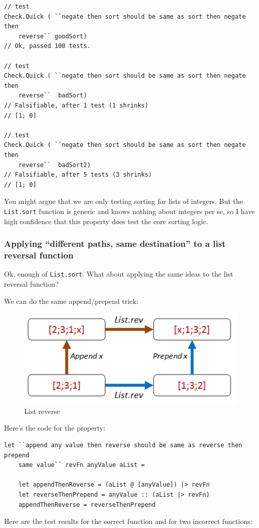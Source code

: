 \begin{verbatim}
// test
Check.Quick ( ``negate then sort should be same as sort then negate then 
    reverse`` goodSort)
// Ok, passed 100 tests.

// test
Check.Quick ( ``negate then sort should be same as sort then negate then 
    reverse``  badSort)
// Falsifiable, after 1 test (1 shrinks) 
// [1; 0]

// test
Check.Quick ( ``negate then sort should be same as sort then negate then 
    reverse``  badSort2)
// Falsifiable, after 5 tests (3 shrinks) 
// [1; 0]
\end{verbatim}
You might argue that we are only testing sorting for lists of integers. But the \texttt{List.sort} function is generic and knows nothing about integers per se, so I have high confidence that this property does test the core sorting logic.




\subsubsection{Applying ``different paths, same destination'' to a list
reversal function}
\label{applying-different-paths-same-destination-to-a-list-reversal-function}

Ok, enough of \texttt{List.sort}. What about applying the same ideas to
the list reversal function?

We can do the same append/prepend trick:

\begin{figure}[htbp]
\centering
\includegraphics{pics/property_list_rev.png}
\caption{List reverse}
\end{figure}

Here's the code for the property:

\begin{verbatim}
let ``append any value then reverse should be same as reverse then prepend 
    same value`` revFn anyValue aList = 
  
	let appendThenReverse = (aList @ [anyValue]) |> revFn 
	let reverseThenPrepend = anyValue :: (aList |> revFn)
	appendThenReverse = reverseThenPrepend 
\end{verbatim}
Here are the test results for the correct function and for two incorrect
functions:

